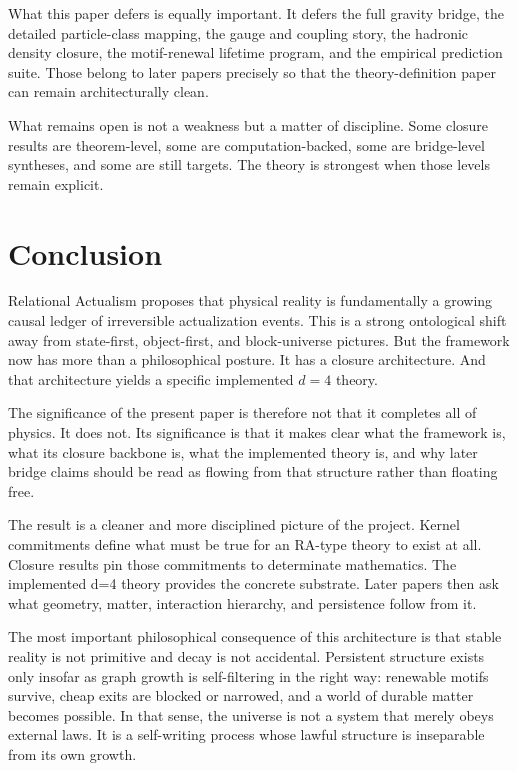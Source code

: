 \documentclass[11pt]{article}
\begin{document}
What this paper defers is equally important. It defers the full gravity bridge, the detailed particle-class mapping, the gauge and coupling story, the hadronic density closure, the motif-renewal lifetime program, and the empirical prediction suite. Those belong to later papers precisely so that the theory-definition paper can remain architecturally clean.

What remains open is not a weakness but a matter of discipline. Some closure results are theorem-level, some are computation-backed, some are bridge-level syntheses, and some are still targets. The theory is strongest when those levels remain explicit.

\section{Conclusion}\label{sec:conclusion}
Relational Actualism proposes that physical reality is fundamentally a growing causal ledger of irreversible actualization events. This is a strong ontological shift away from state-first, object-first, and block-universe pictures. But the framework now has more than a philosophical posture. It has a closure architecture. And that architecture yields a specific implemented $d=4$ theory.

The significance of the present paper is therefore not that it completes all of physics. It does not. Its significance is that it makes clear what the framework is, what its closure backbone is, what the implemented theory is, and why later bridge claims should be read as flowing from that structure rather than floating free.

The result is a cleaner and more disciplined picture of the project. Kernel commitments define what must be true for an RA-type theory to exist at all. Closure results pin those commitments to determinate mathematics. The implemented d=4 theory provides the concrete substrate. Later papers then ask what geometry, matter, interaction hierarchy, and persistence follow from it.

The most important philosophical consequence of this architecture is that stable reality is not primitive and decay is not accidental. Persistent structure exists only insofar as graph growth is self-filtering in the right way: renewable motifs survive, cheap exits are blocked or narrowed, and a world of durable matter becomes possible. In that sense, the universe is not a system that merely obeys external laws. It is a self-writing process whose lawful structure is inseparable from its own growth.



\end{document}
